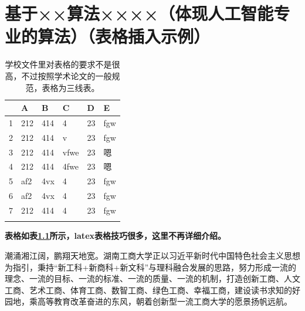 \chapter{基于××算法××××（体现人工智能专业的算法）（表格插入示例）}

\begin{table}[htb]
  \centering
  \caption{学校文件里对表格的要求不是很高，不过按照学术论文的一般规范，表格为三线表。}
  \label{T.example}
  \begin{tabular}{llllll}
  \hline
   & A  & B  & C  & D  & E \\
  \hline
1 	& 212 & 414 & 4 		& 23 & fgw	\\
2 	& 212 & 414 & v 		& 23 & fgw	\\
3 	& 212 & 414 & vfwe		& 23 & 嗯	\\
4 	& 212 & 414 & 4fwe		& 23 & 嗯	\\
5 	& af2 & 4vx & 4 		& 23 & fgw	\\
6 	& af2 & 4vx & 4 		& 23 & fgw	\\
7 	& 212 & 414 & 4 		& 23 & fgw	\\

\hline{}
\end{tabular}
\end{table}

\textbf{表格如表\ref{T.example}所示，latex表格技巧很多，这里不再详细介绍。}

潮涌湘江阔，鹏翔天地宽。湖南工商大学正以习近平新时代中国特色社会主义思想为指引，秉持“新工科+新商科+新文科”与理科融合发展的思路，努力形成一流的理念、一流的目标、一流的标准、一流的质量、一流的机制，打造创新工商、人文工商、艺术工商、体育工商、数智工商、绿色工商、幸福工商，建设读书求知的好园地，乘高等教育改革奋进的东风，朝着创新型一流工商大学的愿景扬帆远航。


\newpage




\newpage